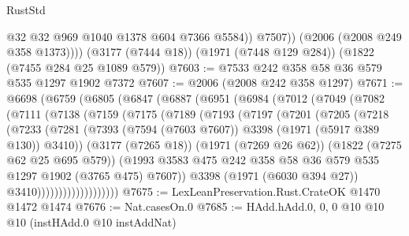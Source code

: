 \begin{lexlean}{RustStd}
\begin{coremodule}
                @32
                @32
                @969
                @1040
                @1378
                @604
                @7366
                @5584))
            @7507))
        (@2006 (@2008 @249 @358 @1373))))
    (@3177 (@7444 @18))
    (@1971 (@7448 @129 @284))
    (@1822 (@7455 @284 @25 @1089 @579))
@7603 := @7533 @242 @358 @58 @36 @579 @535 @1297 @1902 @7372
@7607 := @2006 (@2008 @242 @358 @1297)
@7671 := @6698
    (@6759
      (@6805
        (@6847
          (@6887
            (@6951
              (@6984
                (@7012
                  (@7049
                    (@7082
                      (@7111
                        (@7138
                          (@7159
                            (@7175
                              (@7189
                                (@7193
                                  (@7197
                                    (@7201
                                      (@7205
                                        (@7218
                                          (@7233
                                            (@7281
                                              (@7393
                                                (@7594 (@7603 @7607))
                                                @3398
                                                (@1971 (@5917 @389 @130))
                                                @3410))
                                            (@3177 (@7265 @18))
                                            (@1971 (@7269 @26 @62))
                                            (@1822 (@7275 @62 @25 @695 @579))
                                            (@1993
                                              @3583
                                              @475
                                              @242
                                              @358
                                              @58
                                              @36
                                              @579
                                              @535
                                              @1297
                                              @1902
                                              (@3765 @475)
                                              @7607))
                                          @3398
                                          (@1971 (@6030 @394 @27))
                                          @3410)))))))))))))))))))
@7675 := LexLeanPreservation.Rust.CrateOK @1470 @1472 @1474
@7676 := Nat.casesOn.{0}
@7685 := HAdd.hAdd.{0, 0, 0} @10 @10 @10 (instHAdd.{0} @10 instAddNat)

\end{coremodule}
\end{lexlean}
